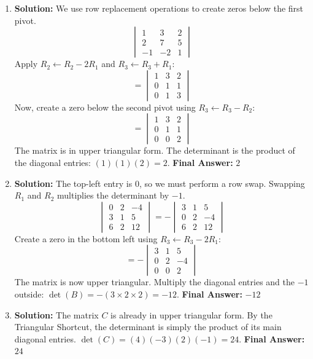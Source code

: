 \documentclass[11pt]{article}
\begin{document}
\begin{enumerate}

    \item \textbf{Solution:} We use row replacement operations to create zeros below the first pivot.
    \[ \begin{vmatrix} 1 & 3 & 2 \\ 2 & 7 & 5 \\ -1 & -2 & 1 \end{vmatrix} \]
    Apply $R_2 \leftarrow R_2 - 2R_1$ and $R_3 \leftarrow R_3 + R_1$:
    \[ = \begin{vmatrix} 1 & 3 & 2 \\ 0 & 1 & 1 \\ 0 & 1 & 3 \end{vmatrix} \]
    Now, create a zero below the second pivot using $R_3 \leftarrow R_3 - R_2$:
    \[ = \begin{vmatrix} 1 & 3 & 2 \\ 0 & 1 & 1 \\ 0 & 0 & 2 \end{vmatrix} \]
    The matrix is in upper triangular form. The determinant is the product of the diagonal entries: $(1)(1)(2) = 2$.
    \textbf{Final Answer:} $2$

    \item \textbf{Solution:} The top-left entry is 0, so we must perform a row swap. Swapping $R_1$ and $R_2$ multiplies the determinant by $-1$.
    \[ \begin{vmatrix} 0 & 2 & -4 \\ 3 & 1 & 5 \\ 6 & 2 & 12 \end{vmatrix} = - \begin{vmatrix} 3 & 1 & 5 \\ 0 & 2 & -4 \\ 6 & 2 & 12 \end{vmatrix} \]
    Create a zero in the bottom left using $R_3 \leftarrow R_3 - 2R_1$:
    \[ = - \begin{vmatrix} 3 & 1 & 5 \\ 0 & 2 & -4 \\ 0 & 0 & 2 \end{vmatrix} \]
    The matrix is now upper triangular. Multiply the diagonal entries and the $-1$ outside:
    $\det(B) = -(3 \times 2 \times 2) = -12$.
    \textbf{Final Answer:} $-12$

    \item \textbf{Solution:} The matrix $C$ is already in upper triangular form. By the Triangular Shortcut, the determinant is simply the product of its main diagonal entries.
    $\det(C) = (4)(-3)(2)(-1) = 24$.
    \textbf{Final Answer:} $24$


\end{enumerate}
\end{document}
